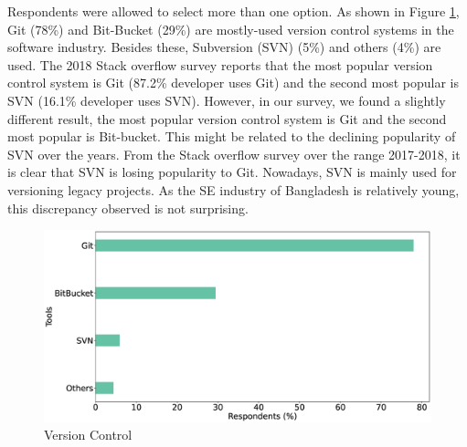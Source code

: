 Respondents were allowed to select more than one option. As shown in Figure \ref{fig:versionControl}, Git (78\%) and Bit-Bucket (29\%) are mostly-used version control systems in the software industry. Besides these, Subversion (SVN) (5\%) and others (4\%) are used.  The 2018 Stack overflow survey\cite{StackoverflowSurvey2018} reports that the most popular version control system is Git (87.2\% developer uses Git) and the second most popular is SVN (16.1\% developer uses SVN). However, in our survey, we found a slightly different result, the most popular version control system is Git and the second most popular is Bit-bucket. This might be related to the declining popularity of SVN over the years. From the Stack overflow survey over the range 2017-2018, it is clear that SVN is losing popularity to Git. Nowadays, SVN is mainly used for versioning legacy projects. As the SE industry of Bangladesh is relatively young, this discrepancy observed is not surprising.
  
\begin{figure}[h]
\centering
  \includegraphics[scale=0.16]{Figures/Respondents_version_control}
  \caption{Version Control}
  \label{fig:versionControl}
\end{figure}
